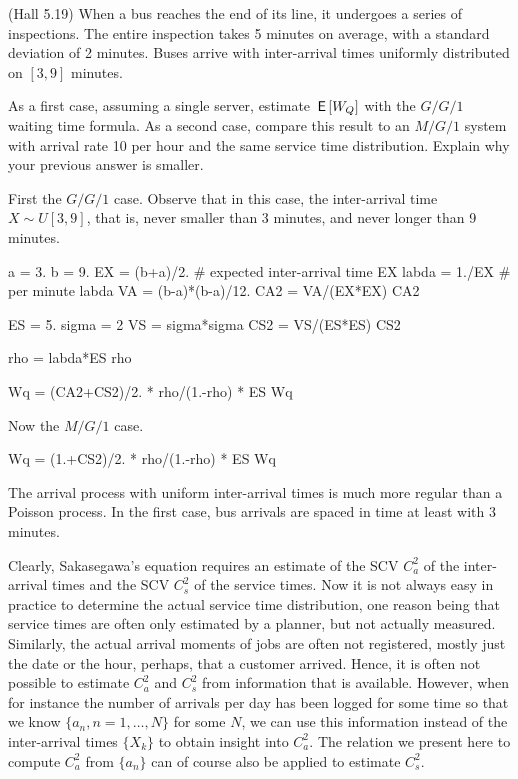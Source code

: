 \begin{exercise}\label{ex:91}
  (Hall 5.19) When a bus reaches the end of its line, it undergoes a
  series of inspections. The entire inspection takes 5 minutes on
  average, with a standard deviation of 2 minutes. Buses arrive with
  inter-arrival times uniformly distributed on $[3,9]$ minutes.

As a first case,  assuming a single server, estimate $\,\mathsf{E}\left[W_Q\right]$ with the $G/G/1$ waiting time formula. As a second case, compare this result to an $M/G/1$ system with arrival rate 10 per hour and the same service time distribution. Explain why your previous answer is smaller. 
\begin{solution}
First the $G/G/1$ case. Observe that in this case, the inter-arrival time $X\sim U[3,9]$, that is, never smaller than 3 minutes, and never longer than 9 minutes. 

\begin{pyconsole}
  
a = 3.
b = 9. 
EX = (b+a)/2. # expected inter-arrival time
EX
labda = 1./EX # per minute
labda
VA = (b-a)*(b-a)/12.
CA2 = VA/(EX*EX)
CA2

ES = 5.
sigma = 2
VS = sigma*sigma
CS2 = VS/(ES*ES)
CS2

rho = labda*ES
rho

Wq = (CA2+CS2)/2. * rho/(1.-rho) * ES
Wq
\end{pyconsole}

Now  the $M/G/1$ case.

\begin{pyconsole}
Wq = (1.+CS2)/2. * rho/(1.-rho) * ES
Wq
\end{pyconsole}

The arrival process with uniform inter-arrival times is much more
regular than a Poisson process. In the first case, bus arrivals are
spaced in time at least with 3 minutes.
\end{solution}
\end{exercise}



Clearly, Sakasegawa's equation requires an estimate of the SCV $C_a^2$ of the inter-arrival times and the SCV $C_s^2$ of the service times.
Now it is not always easy in practice to determine the actual service time distribution, one reason being that service times are often only estimated by a planner, but not actually measured.
Similarly, the actual arrival moments of jobs are often not registered, mostly just the date or the hour, perhaps, that a customer arrived.
Hence, it is often not possible to estimate $C_a^2$ and $C_s^2$ from information that is available.
However, when for instance the number of arrivals per day has been logged for some time so that we know $\{a_n, n=1,\ldots, N\}$ for some $N$, we can use this information instead of the inter-arrival times $\{X_k\}$ to obtain insight into $C_a^2$.
The relation we present here to compute $C_a^2$ from $\{a_n\}$ can of course also be applied to estimate $C_s^2$.

